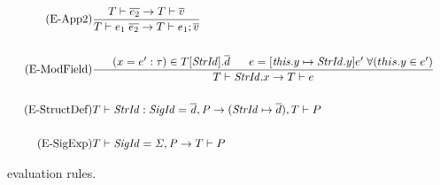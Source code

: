\begin{figure}[htb]
\begin{align*}
\\
\\
\tag{E-App2}
&\frac{T \vdash \overline{e_{2}} \rightarrow T \vdash \overline{v}}
{T \vdash e_{1}\;\overline{e_{2}} \rightarrow T \vdash e_{1};\overline{v}}
\\
\\
\tag{E-ModField}
&\frac{\;\;\;\;\;\; (x=e':\tau) \in T[\mathit{StrId}].\overline{d} \;\;\;\;\;\; e=[\mathit{this}.y\mapsto \mathit{StrId}.y]e'\;\forall (this.y \in e')}
{T \vdash \mathit{StrId}.x \rightarrow T \vdash e}\\
\\
\tag{E-StructDef}
&T \vdash \mathit{StrId:SigId = \overline{d},P} \rightarrow (\mathit{StrId} \mapsto \overline{d}), T \vdash P \\
\\
\tag{E-SigExp}
&T \vdash \mathit{SigId = \Sigma, P} \rightarrow T \vdash P
\end{align*}
\caption[\MiniML\ Evaluation Rules]{\MiniML\ evaluation rules.\label{fig:MiniMLOperationalSemantics}}
\end{figure}
